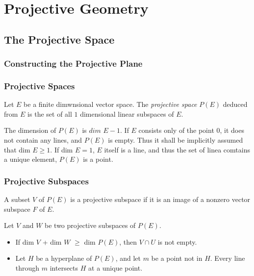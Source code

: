 \chapter{Projective Geometry}
\label{chap:projgeo}

\section{The Projective Space}

\subsection{Constructing the Projective Plane}

\subsection{Projective Spaces}

\begin{definition}
  Let $E$ be a finite dimwnsional vector space. The \textit{projective space} $P(E)$ deduced
  from $E$ is the set of all $1$ dimensional linear subspaces of $E$. \cite{audin}
\end{definition}

\begin{remark}
  The dimension of $P(E)$ is $dim$ $E-1$. If $E$ consists only of the point $0$, it does not
  contain any lines, and $P(E)$ is empty. Thus it shall be implicitly assumed that dim $E\ge1$.
  If dim $E=1$, $E$ itself is a line, and thus the set of linea comtains a unique element,
  $P(E)$ is a point.
\end{remark}

\subsection{Projective Subspaces}
A subset $V$ of $P(E)$ is a projective subspace if it is an image of a nonzero vector subspace
$F$ of $E$.

\begin{prop}
  Let $V$ and $W$ be two projective subspaces of $P(E)$.
  
  \begin{itemize}
    \item If dim $V$ + dim $W$ $\ge$ dim $P(E)$, then $V\cap U$ is not empty.
    \item Let $H$ be a hyperplane of $P(E)$, and let $m$ be a point not in $H$. Every
      line through $m$ intersects $H$ at a unique point.
  \end{itemize}

\end{prop}

